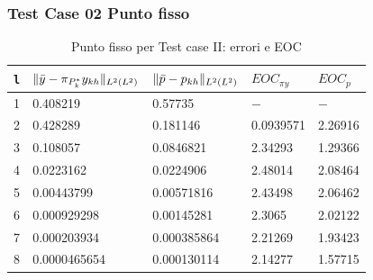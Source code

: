 \documentclass{beamer}
\theoremstyle{definition}
\theoremstyle{remark}
\theoremstyle{plain}
\theoremstyle{definition}
\DeclarePairedDelimiter{\norma}{\lVert}{\rVert}
\begin{document}
\begin{frame}
\frametitle{Test Case 02 Punto fisso}
\begin{table}
\caption{Punto fisso per Test case II: errori e EOC }
\label{puntofissoIIbis}
\centering

\begin{tabular}{cllll}
\toprule
{\texttt{l}}           &  {$ \norma{\bar{y}-\pi_{P^*_k}y_{kh}}_{L^2(L^2)} $} &  {$ \norma{\bar{p}-p_{kh}}_{L^2(L^2)} $} &  {$ EOC_{\pi y} $} &  {$ EOC_p $} \\
\midrule
1            &  0.408219 &  0.57735 &  {$-$} &  {$-$} \\
2            &  0.428289 &  0.181146 &  0.0939571 &  2.26916 \\
3            &  0.108057  &  0.0846821 &  2.34293 &  1.29366 \\
4            &  0.0223162  &  0.0224906 &  2.48014 &  2.08464 \\
5            &  0.00443799 &  0.00571816 &  2.43498 &  2.06462 \\
6            &  0.000929298 &  0.00145281 &  2.3065 &  2.02122 \\
7            &  0.000203934 &  0.000385864 &  2.21269 &  1.93423 \\      
8            &  0.0000465654 &  0.000130114 &  2.14277 &  1.57715 \\
\bottomrule
\end{tabular}              
\end{table}

\end{frame}
\end{document}
